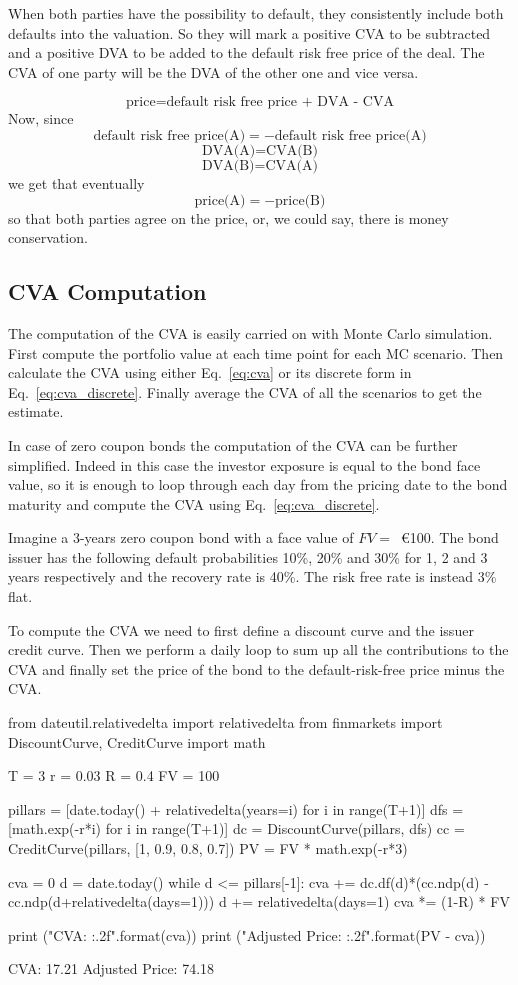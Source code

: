 When both parties have the possibility to default, they consistently include both defaults into the valuation. So they will mark a positive CVA to be subtracted and a positive DVA to be added to the default risk free price of the deal. The CVA of one party will be the DVA of the other one and vice versa.

\[
\textrm{price}=\textrm{default risk free price + DVA - CVA}
\]
Now, since
\[
\textrm{default risk free price(A)} = - \textrm{default risk free price(A)}
\]
\[
\textrm{DVA(A)} = \textrm{CVA(B)}
\]
\[
\textrm{DVA(B)} = \textrm{CVA(A)}
\]
we get that eventually
\[
\textrm{price(A)} = -\textrm{price(B)}
\]
so that both parties agree on the price, or, we could say, there is money conservation.

\subsection{CVA Computation}

The computation of the CVA is easily carried on with Monte Carlo simulation. 
First compute the portfolio value at each time point for each MC scenario. Then calculate the CVA using either Eq.~\ref{eq:cva} or its discrete form in Eq.~\ref{eq:cva_discrete}. Finally average the CVA of all the scenarios to get the estimate.

In case of zero coupon bonds the computation of the CVA can be further simplified. Indeed in this case the investor exposure is equal to the bond face value, so it is enough to loop through each day from the pricing date to the bond maturity and compute the CVA using Eq.~\ref{eq:cva_discrete}.

Imagine a 3-years zero coupon bond with a face value of $FV=$~\euro{100}. The bond issuer has the following default probabilities 10\%, 20\% and 30\% for 1, 2 and 3 years respectively and the recovery rate is 40\%. The risk free rate is instead 3\% flat. 

To compute the CVA we need to first define a discount curve and the issuer credit curve. Then we perform a daily loop to sum up all the contributions to the CVA and finally set the price of the bond to the default-risk-free price minus the CVA.

\begin{ipython}
from dateutil.relativedelta import relativedelta
from finmarkets import DiscountCurve, CreditCurve
import math

T = 3
r = 0.03
R = 0.4
FV = 100

pillars = [date.today() + relativedelta(years=i) for i in range(T+1)]
dfs = [math.exp(-r*i) for i in range(T+1)]
dc = DiscountCurve(pillars, dfs)
cc = CreditCurve(pillars, [1, 0.9, 0.8, 0.7])
PV = FV * math.exp(-r*3)

cva = 0
d = date.today()
while d <= pillars[-1]:
    cva += dc.df(d)*(cc.ndp(d) - cc.ndp(d+relativedelta(days=1)))
    d += relativedelta(days=1)
cva *= (1-R) * FV

print ("CVA: {:.2f}".format(cva))
print ("Adjusted Price: {:.2f}".format(PV - cva))
\end{ipython}
\begin{ioutput}
CVA: 17.21
Adjusted Price: 74.18
\end{ioutput}

